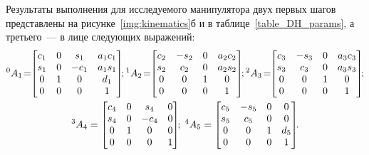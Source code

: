 Результаты выполнения для исследуемого манипулятора двух первых шагов представлены на рисунке~\ref{img:kinematics}б и в таблице~\ref{table_DH_params}, а третьего~--- в лице следующих выражений:
\begin{gather}
	{}^0A_1\! =\!\!
    \left[\begin{matrix}c_1 & 0 & s_1 & a_{1} c_1\\s_1 & 0 & - c_1 & a_{1} s_1\\0 & 1 & 0 & d_{1}\\0 & 0 & 0 & 1\end{matrix}\right]\!\!;
	{}^1A_2\! =\!\!
	\left[\begin{matrix}c_2 & - s_2 & 0 & a_{2} c_2\\s_2 & c_2 & 0 & a_{2} s_2\\0 & 0 & 1 & 0\\0 & 0 & 0 & 1\end{matrix}\right]\!\!;
	{}^2A_3\! =\!\!
	\left[\begin{matrix}c_3 & - s_3 & 0 & a_{3} c_3\\s_3 & c_3 & 0 & a_{3} s_3\\0 & 0 & 1 & 0\\0 & 0 & 0 & 1\end{matrix}\right]\!\!;\notag
	\\
	{}^3A_4 =
	 \left[\begin{matrix}c_4 & 0 & s_4 & 0\\s_4 & 0 & - c_4 & 0\\0 & 1 & 0 & 0\\0 & 0 & 0 & 1\end{matrix}\right]\!\!;
	\;
	{}^4A_5 =
	\left[\begin{matrix}c_5 & - s_5 & 0 & 0\\s_5 & c_5 & 0 & 0\\0 & 0 & 1 & d_{5}\\0 & 0 & 0 & 1\end{matrix}\right]\!\!\ldotp
	\label{eq_all_ht_matrices}
\end{gather}

